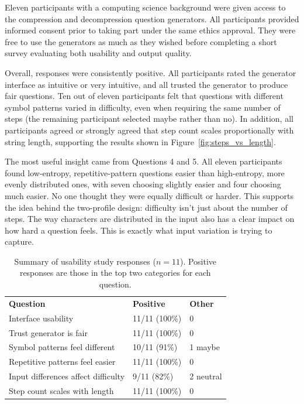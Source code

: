 \documentclass{l4proj}
\begin{document}
Eleven participants with a computing science background were given access to the compression and decompression question generators. All participants provided informed consent prior to taking part under the same ethics approval. They were free to use the generators as much as they wished before completing a short survey evaluating both usability and output quality.

Overall, responses were consistently positive. All participants rated the generator interface as intuitive or very intuitive, and all trusted the generator to produce fair questions. Ten out of eleven participants felt that questions with different symbol patterns varied in difficulty, even when requiring the same number of steps (the remaining participant selected maybe rather than no). In addition, all participants agreed or strongly agreed that step count scales proportionally with string length, supporting the  results shown in Figure~\ref{fig:steps_vs_length}.

The most useful insight came from Questions 4 and 5. All eleven participants found low-entropy, repetitive-pattern questions easier than high-entropy, more evenly distributed ones, with seven choosing slightly easier and four choosing much easier. No one thought they were equally difficult or harder. This supports the idea behind the two-profile design: difficulty isn’t just about the number of steps. The way characters are distributed in the input also has a clear impact on how hard a question feels. This is exactly what input variation is trying to capture.

\begin{table}[htb]
\label{tab:usability_summary}
\begin{tabular}{@{}lll@{}}
\textbf{Question} & \textbf{Positive} & \textbf{Other} \\
Interface usability              & 11/11 (100\%) & 0 \\
Trust generator is fair          & 11/11 (100\%) & 0 \\
Symbol patterns feel different   & 10/11 (91\%)  & 1 maybe \\
Repetitive patterns feel easier  & 11/11 (100\%) & 0 \\
Input differences affect difficulty & 9/11 (82\%) & 2 neutral \\
Step count scales with length    & 11/11 (100\%) & 0 \\
\end{tabular}
\caption{Summary of usability study responses ($n = 11$). Positive responses are those in the top two categories for each question.}
\end{table}
\end{document}
